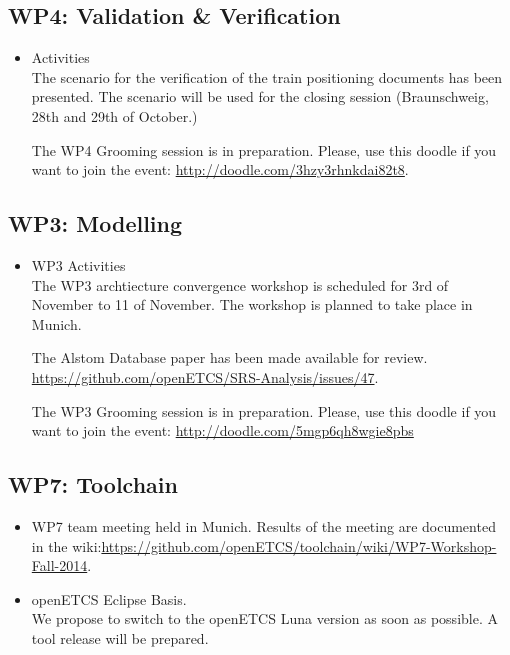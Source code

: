 \documentclass[a4paper, 11pt]{article}
\begin{document}
\subsection{WP4: Validation \& Verification}
\begin{itemize}

\item Activities\\
The scenario for the verification of the train positioning documents has been presented. The scenario will be used for the closing session (Braunschweig, 28th and 29th of October.)

The WP4 Grooming session is in preparation. Please, use this doodle if you want to join the event:
\url{http://doodle.com/3hzy3rhnkdai82t8}.

\end{itemize}

\subsection{WP3: Modelling}
\begin{itemize}

\item WP3 Activities\\
The WP3 archtiecture convergence workshop is scheduled for 3rd of November to 11 of November. The workshop is planned to take place in Munich.

The Alstom Database paper has been made available for review. \url{https://github.com/openETCS/SRS-Analysis/issues/47}.

The WP3 Grooming session is in preparation. Please, use this doodle if you want to join the event:
\url{http://doodle.com/5mgp6qh8wgie8pbs}

\end{itemize}

\subsection{WP7: Toolchain}

\begin{itemize}
\item WP7 team meeting held in Munich. Results of the meeting are documented in the wiki:\url{https://github.com/openETCS/toolchain/wiki/WP7-Workshop-Fall-2014}. 
\item openETCS Eclipse Basis.\\
We propose to switch to the openETCS Luna version as soon as possible. A tool release will be prepared.

\end{itemize}
\end{document}
